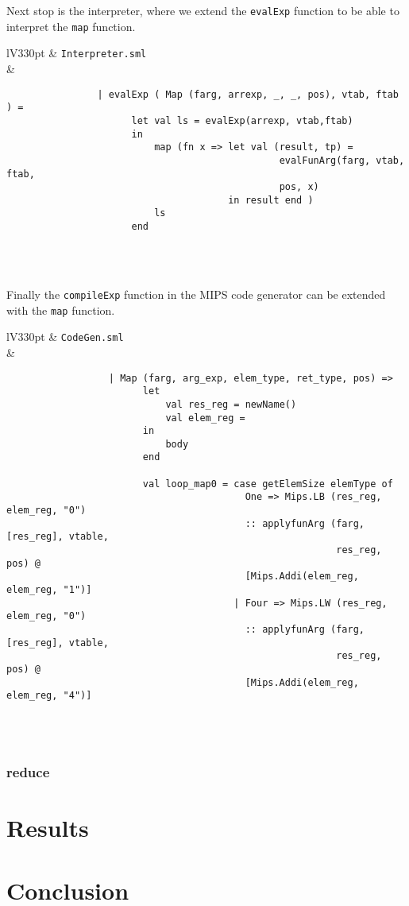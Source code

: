 \documentclass[a4paper]{article}
\begin{document}
	Next stop is the interpreter, where we extend the \verb|evalExp| function to be able to interpret the \verb|map| function.
	
	\begin{center}	
		\begin{tabular}{lV{330pt}}
			\toprule
			& \verb|Interpreter.sml|\\
			\midrule
			&
			\begin{verbatim}
				| evalExp ( Map (farg, arrexp, _, _, pos), vtab, ftab ) = 
				      let val ls = evalExp(arrexp, vtab,ftab)
				      in
				          map (fn x => let val (result, tp) =
				                                evalFunArg(farg, vtab, ftab, 
				                                pos, x)
				                       in result end ) 
				          ls
				      end
			\end{verbatim}
			\\
			\bottomrule \\
		\end{tabular}
	\end{center}
	
	Finally the \verb|compileExp| function in the MIPS code generator can be extended with the \verb|map| function.
	
	\begin{center}	
		\begin{tabular}{lV{330pt}}
			\toprule
			& \verb|CodeGen.sml|\\
			\midrule
			&
			\begin{verbatim}
				  | Map (farg, arg_exp, elem_type, ret_type, pos) => 
				        let
				            val res_reg = newName()
				            val elem_reg = 
				        in
				            body
				        end
				        
				        val loop_map0 = case getElemSize elemType of
				                          One => Mips.LB (res_reg, elem_reg, "0") 
				                          :: applyfunArg (farg, [res_reg], vtable,
				                                          res_reg, pos) @ 
				                          [Mips.Addi(elem_reg, elem_reg, "1")]
				                        | Four => Mips.LW (res_reg, elem_reg, "0")
				                          :: applyfunArg (farg, [res_reg], vtable,
				                                          res_reg, pos) @ 
				                          [Mips.Addi(elem_reg, elem_reg, "4")]
			\end{verbatim}
			\\
			\bottomrule \\
		\end{tabular}
	\end{center}
	
\subsubsection{reduce}

\section{Results}
\section{Conclusion}
\end{document}
